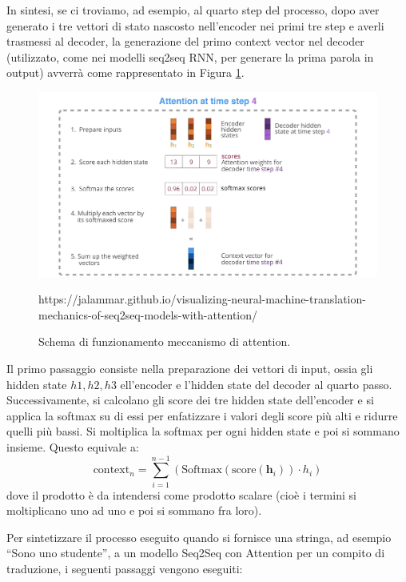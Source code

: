\documentclass[12pt,a4paper,twoside,openright]{book}
\begin{document}
In sintesi, se ci troviamo, ad esempio, al quarto step del processo, dopo aver generato i tre vettori di stato nascosto nell'encoder nei primi tre step e averli trasmessi al decoder, la generazione del primo context vector nel decoder (utilizzato, come nei modelli seq2seq RNN, per generare la prima parola in output) avverrà come rappresentato in Figura \ref{fig:attention_scheme}.

\begin{figure}
    \centering
    \includegraphics[width=\textwidth]{images/attention_process.jpg}
    \caption{Schema di funzionamento meccanismo di attention.}
    \label{fig:attention_scheme}
    \tiny{https://jalammar.github.io/visualizing-neural-machine-translation-mechanics-of-seq2seq-models-with-attention/}
\end{figure}

Il primo passaggio consiste nella preparazione dei vettori di input, ossia gli hidden state $h1, h2, h3$ ell'encoder e l'hidden state del decoder al quarto passo. Successivamente, si calcolano gli score dei tre hidden state dell'encoder e si applica la softmax su di essi per enfatizzare i valori degli score più alti e ridurre quelli più bassi. Si moltiplica la softmax per ogni hidden state e poi si sommano insieme.
Questo equivale a:
\begin{equation*}
\text{context}_n = \sum_{i=1}^{n-1} \left( \text{Softmax}(\text{score}(\mathbf{h}_i)) \cdot h_i \right)
\end{equation*}
dove il prodotto è da intendersi come prodotto scalare (cioè i termini si moltiplicano uno ad uno e poi si sommano fra loro).

Per sintetizzare il processo eseguito quando si fornisce una stringa, ad esempio ``Sono uno studente'', a un modello Seq2Seq con Attention per un compito di traduzione, i seguenti passaggi vengono eseguiti:
\end{document}
